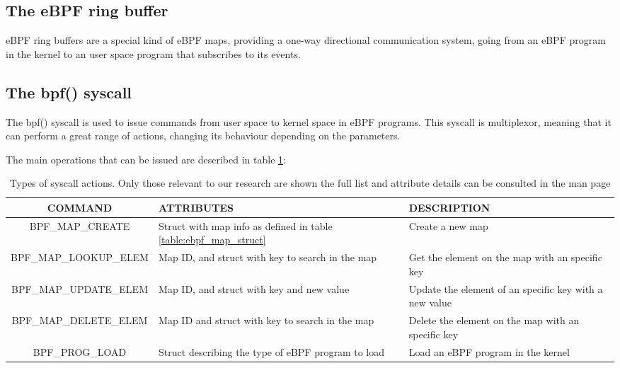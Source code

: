 \subsection{The eBPF ring buffer} \label{subsection:bpf_ring_buf}
eBPF ring buffers are a special kind of eBPF maps, providing a one-way directional communication system, going from an eBPF program in the kernel to an user space program that subscribes to its events.


\subsection{The bpf() syscall} \label{subsection:bpf_syscall}
The bpf() syscall is used to issue commands from user space to kernel space in eBPF programs. This syscall is multiplexor, meaning that it can perform a great range of actions, changing its behaviour depending on the parameters.

The main operations that can be issued are described in table \ref{table:ebpf_syscall}:

\begin{table}[htbp]
\begin{tabular}{|c|>{\centering\arraybackslash}p{5cm}|>{\centering\arraybackslash}p{5cm}|}
\hline
COMMAND & ATTRIBUTES & DESCRIPTION\\
\hline
\hline
BPF\_MAP\_CREATE & Struct with map info as defined in table \ref{table:ebpf_map_struct} & Create a new map\\
\hline
BPF\_MAP\_LOOKUP\_ELEM & Map ID, and struct with key to search in the map & Get the element on the map with an specific key\\
\hline
BPF\_MAP\_UPDATE\_ELEM & Map ID, and struct with key and new value & Update the element of an specific key with a new value\\
\hline
BPF\_MAP\_DELETE\_ELEM & Map ID and struct with key to search in the map & Delete the element on the map with an specific key\\
\hline
BPF\_PROG\_LOAD & Struct describing the type of eBPF program to load & Load an eBPF program in the kernel\\
\hline
\end{tabular}
\caption{Types of syscall actions. Only those relevant to our research are shown the full list and attribute details can be consulted in the man page \cite{bpf_syscall}}
\label{table:ebpf_syscall}
\end{table}

